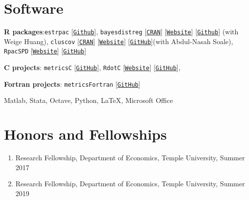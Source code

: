 \documentclass[12pt,letterpaper]{article}
\renewenvironment{itemize}{
  \begin{list}{}{
    \setlength{\leftmargin}{1.5em}
  }
}{
  \end{list}
}
\begin{document}
\section*{Software}
\begin{itemize}
  \item \textbf{R packages}:\texttt{estrpac} [\texttt{\href{https://github.com/estsyawo/estrpac}{Github}}], \texttt{bayesdistreg} [\texttt{\href{https://CRAN.R-project.org/package=bayesdistreg}{CRAN}}] [\texttt{\href{https://estsyawo.github.io/bayesdistreg/}{Website}}] [\texttt{\href{https://github.com/estsyawo/bayesdistreg}{Github}}] (with Weige Huang), \texttt{cluscov} [\texttt{\href{https://CRAN.R-project.org/package=cluscov}{CRAN}}] [\texttt{\href{https://estsyawo.github.io/cluscov/}{Website}}] [\texttt{\href{https://github.com/estsyawo/cluscov}{GitHub}}](with Abdul-Nasah Soale), \texttt{RpacSPD} [\texttt{\href{https://estsyawo.github.io/RpacSPD/}{Website}}] [\texttt{\href{https://github.com/estsyawo/RpacSPD}{GitHub}}]

  \item \textbf{C projects}: \texttt{metricsC} [\texttt{\href{https://github.com/estsyawo/metricsC}{GitHub}}], \texttt{RdotC} [\texttt{\href{https://estsyawo.github.io/RdotC/index.html}{Website}}] [\texttt{\href{https://github.com/estsyawo/RdotC}{GitHub}}], 
  
  \item \textbf{Fortran projects}: \texttt{metricsFortran} [\texttt{\href{https://github.com/estsyawo/metricsFortran}{GitHub}}]
  \item Matlab,  Stata, Octave, Python, \LaTeX, Microsoft Office
\end{itemize}


\section*{Honors and Fellowships}
\begin{enumerate}
  \item Research Fellowship, Department of Economics, Temple University, Summer 2017
  \item Research Fellowship, Department of Economics, Temple University, Summer 2019
\end{enumerate}
\end{document}
